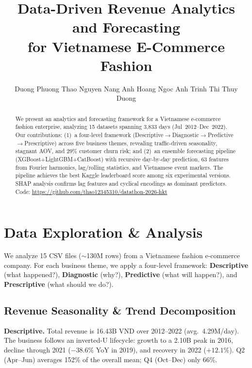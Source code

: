 \documentclass{article}
\title{Data-Driven Revenue Analytics and Forecasting\\for Vietnamese E-Commerce Fashion}
\author{
  Duong Phuong Thao \quad
  Nguyen Nang Anh \quad
  Hoang Ngoc Anh \quad
  Trinh Thi Thuy Duong
}
\begin{document}
\maketitle
\vspace{-0.3cm}

\begin{abstract}
We present an analytics and forecasting framework for a Vietnamese e-commerce fashion enterprise, analyzing 15 datasets spanning 3,833 days (Jul~2012--Dec~2022). Our contributions: (1)~a four-level framework (Descriptive$\to$Diagnostic$\to$Predictive$\to$Prescriptive) across five business themes, revealing traffic-driven seasonality, stagnant AOV, and 29\% customer churn risk; and (2)~an ensemble forecasting pipeline (XGBoost+LightGBM+CatBoost) with recursive day-by-day prediction, 63 features from Fourier harmonics, lag/rolling statistics, and Vietnamese event markers. The pipeline achieves the best Kaggle leaderboard score among six experimental versions. SHAP analysis confirms lag features and cyclical encodings as dominant predictors. Code: \url{https://github.com/thao12345310/datathon-2026-hkt}
\end{abstract}

\section{Data Exploration \& Analysis}

We analyze 15 CSV files ($\sim$130M rows) from a Vietnamese fashion e-commerce company. For each business theme, we apply a four-level framework: \textbf{Descriptive} (what happened?), \textbf{Diagnostic} (why?), \textbf{Predictive} (what will happen?), and \textbf{Prescriptive} (what should we do?).

\subsection{Revenue Seasonality \& Trend Decomposition}

\textbf{Descriptive.} Total revenue is 16.43B VND over 2012--2022 (avg.\ 4.29M/day). The business follows an inverted-U lifecycle: growth to a 2.10B peak in 2016, decline through 2021 ($-38.6\%$ YoY in 2019), and recovery in 2022 ($+12.1\%$). Q2 (Apr--Jun) averages 152\% of the overall mean; Q4 (Oct--Dec) only 66\%.
\end{document}
